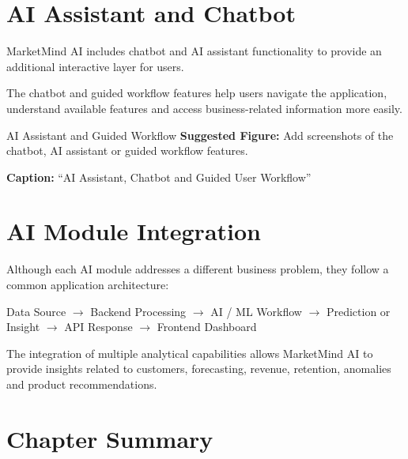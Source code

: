 \documentclass[12pt,a4paper]{report}
\begin{document}

\section{AI Assistant and Chatbot}

MarketMind AI includes chatbot and AI assistant functionality to
provide an additional interactive layer for users.

The chatbot and guided workflow features help users navigate the
application, understand available features and access business-related
information more easily.

\begin{screenshotplaceholder}{AI Assistant and Guided Workflow}
\textbf{Suggested Figure:} Add screenshots of the chatbot, AI assistant
or guided workflow features.

\textbf{Caption:} ``AI Assistant, Chatbot and Guided User Workflow''
\end{screenshotplaceholder}



\section{AI Module Integration}

Although each AI module addresses a different business problem, they
follow a common application architecture:

\begin{center}
Data Source
$\rightarrow$
Backend Processing
$\rightarrow$
AI / ML Workflow
$\rightarrow$
Prediction or Insight
$\rightarrow$
API Response
$\rightarrow$
Frontend Dashboard
\end{center}

The integration of multiple analytical capabilities allows MarketMind AI
to provide insights related to customers, forecasting, revenue,
retention, anomalies and product recommendations.



\section{Chapter Summary}
\end{document}
